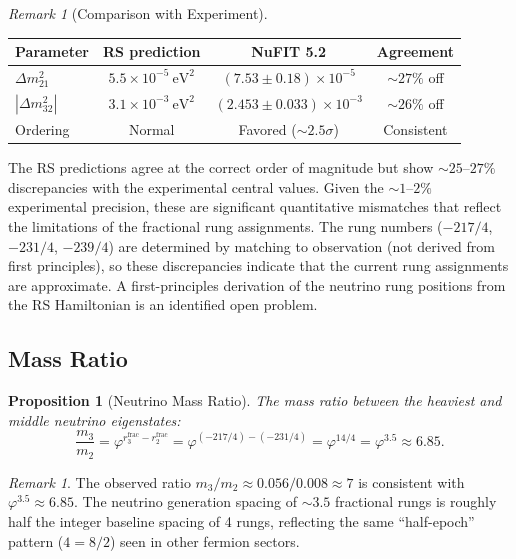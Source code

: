 \documentclass[12pt,a4paper]{article}
\newtheorem{proposition}[theorem]{Proposition}
\theoremstyle{definition}
\theoremstyle{remark}
\newtheorem{remark}[theorem]{Remark}
\begin{document}
\begin{remark}[Comparison with Experiment]
\begin{center}
\renewcommand{\arraystretch}{1.3}
\begin{tabular}{@{}lccc@{}}
\toprule
\textbf{Parameter} & \textbf{RS prediction} &
\textbf{NuFIT 5.2} & \textbf{Agreement} \\
\midrule
$\Delta m^2_{21}$ &
$5.5 \times 10^{-5}~\mathrm{eV}^2$ &
$(7.53 \pm 0.18) \times 10^{-5}$ &
$\sim 27\%$ off \\
$|\Delta m^2_{32}|$ &
$3.1 \times 10^{-3}~\mathrm{eV}^2$ &
$(2.453 \pm 0.033) \times 10^{-3}$ &
$\sim 26\%$ off \\
Ordering & Normal & Favored ($\sim 2.5\sigma$) &
Consistent \\
\bottomrule
\end{tabular}
\end{center}

The RS predictions agree at the correct order of magnitude but
show $\sim 25$--$27\%$ discrepancies with the experimental
central values.  Given the $\sim 1$--$2\%$ experimental
precision, these are significant quantitative mismatches that
reflect the limitations of the fractional rung assignments.
The rung numbers ($-217/4$, $-231/4$, $-239/4$) are determined
by matching to observation (not derived from first principles),
so these discrepancies indicate that the current rung assignments
are approximate.  A first-principles derivation of the neutrino
rung positions from the RS Hamiltonian is an identified open
problem.
\end{remark}

\subsection{Mass Ratio}

\begin{proposition}[Neutrino Mass Ratio]
\label{prop:ratio}
The mass ratio between the heaviest and middle neutrino
eigenstates:
\begin{equation}
  \frac{m_3}{m_2} = \varphi^{r_3^{\mathrm{frac}} -
  r_2^{\mathrm{frac}}} = \varphi^{(-217/4) - (-231/4)}
  = \varphi^{14/4} = \varphi^{3.5} \approx 6.85.
\end{equation}
\end{proposition}

\begin{remark}
The observed ratio $m_3/m_2 \approx 0.056/0.008 \approx 7$
is consistent with $\varphi^{3.5} \approx 6.85$.  The
neutrino generation spacing of $\sim 3.5$ fractional rungs
is roughly half the integer baseline spacing of 4 rungs,
reflecting the same ``half-epoch'' pattern ($4 = 8/2$)
seen in other fermion sectors.
\end{remark}
\end{document}
